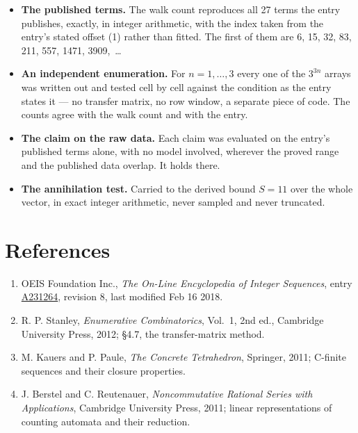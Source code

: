 \documentclass[11pt]{article}
\theoremstyle{definition}
\begin{document}
\begin{itemize}

\item {\bfseries The published terms.} The walk count reproduces all 27 terms the entry publishes, exactly, in integer arithmetic, with the index taken from the entry's stated offset (1) rather than fitted. The first of them are 6, 15, 32, 83, 211, 557, 1471, 3909,~\dots

\item {\bfseries An independent enumeration.} For $n = 1,\dots,3$ every one of the $3^{3n}$ arrays was written out and tested cell by cell against the condition as the entry states it --- no transfer matrix, no row window, a separate piece of code. The counts agree with the walk count and with the entry.

\item {\bfseries The claim on the raw data.} Each claim was evaluated on the entry's published terms alone, with no model involved, wherever the proved range and the published data overlap. It holds there.

\item {\bfseries The annihilation test.} Carried to the derived bound $S = 11$ over the whole vector, in exact integer arithmetic, never sampled and never truncated.

\end{itemize}

\section{References}

\begin{enumerate}

\item OEIS Foundation Inc., \emph{The On-Line Encyclopedia of Integer Sequences}, entry \href{https://oeis.org/A231264}{A231264}, revision 8, last modified Feb 16 2018.

\item R. P. Stanley, \emph{Enumerative Combinatorics}, Vol.~1, 2nd ed., Cambridge University Press, 2012; \S4.7, the transfer-matrix method.

\item M. Kauers and P. Paule, \emph{The Concrete Tetrahedron}, Springer, 2011; C-finite sequences and their closure properties.

\item J. Berstel and C. Reutenauer, \emph{Noncommutative Rational Series with Applications}, Cambridge University Press, 2011; linear representations of counting automata and their reduction.

\end{enumerate}
\end{document}
